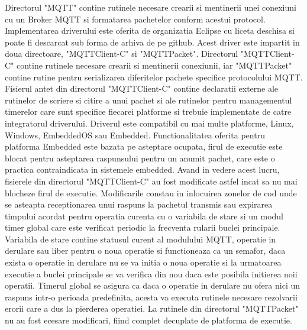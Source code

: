 Directorul "MQTT" contine rutinele necesare crearii si mentinerii unei conexiuni cu un Broker MQTT si formatarea pachetelor conform acestui protocol. Implementarea 
driverului este oferita de organizatia Eclipse cu liceta deschisa si poate fi descarcat sub forma de arhiva de pe github. Acest driver este impartit in doua directoare, 
"MQTTClient-C" si "MQTTPacket". Directorul "MQTTClient-C" contine rutinele necesare crearii si mentinerii conexiunii, iar "MQTTPacket" contine rutine pentru serializarea 
diferitelor pachete specifice protocolului MQTT. Fisierul antet din directorul "MQTTClient-C" contine declaratii externe ale rutinelor de scriere si citire a unui pachet si 
ale rutinelor pentru managementul timerelor care sunt specifice fiecarei platforme si trebuie implementate de catre integratorul driverului. Driverul este compatibil cu 
mai multe platforme, Linux, Windows, EmbeddedOS sau Embedded. Functionalitatea oferita pentru platforma Embedded este bazata pe asteptare ocupata, firul de executie 
este blocat pentru asteptarea raspunsului pentru un anumit pachet, care este o practica contraindicata in sistemele embedded. Avand in vedere acest lucru, fisierele 
din directorul "MQTTClient-C" au fost modificate astfel incat sa nu mai blocheze firul de executie. Modificarile constau in inlocuirea zonelor de cod unde se asteapta 
receptionarea unui raspuns la pachetul transmis sau expirarea timpului acordat pentru operatia curenta cu o variabila de stare si un modul timer global care este 
verificat periodic la frecventa rularii buclei principale. Variabila de stare contine statusul curent al modulului MQTT, operatie in derulare sau liber pentru 
o noua operatie si functioneaza ca un semafor, daca exista o operatie in derulare nu se va initia o noua operatie si la urmatoarea executie a buclei principale se va 
verifica din nou daca este posibila initierea noii operatii. Timerul global se asigura ca daca o operatie in derulare nu ofera nici un raspuns intr-o perioada 
predefinita, acesta va executa rutinele necesare rezolvarii erorii care a dus la pierderea operatiei. La rutinele din directorul "MQTTPacket" nu au fost ecesare 
modificari, fiind complet decuplate de platforma de executie. 

